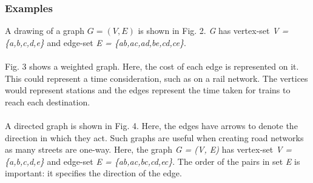 \documentclass[titlepage]{article}
\begin{document}
\subsubsection{Examples}
A drawing of a graph \({G = (V, E)}\) is shown in Fig. 2. \textit{G} has vertex-set \textit{V = \{a,b,c,d,e\}} and edge-set \textit{E = \{ab,ac,ad,be,cd,ce\}}. 
\\\\
Fig. 3 shows a weighted graph. Here, the cost of each edge is represented on it. This could represent a time consideration, such as on a rail network. The vertices would represent stations and the edges represent the time taken for trains to reach each destination. 
\\\\
A directed graph is shown in Fig. 4. Here, the edges have arrows to denote the direction in which they act. Such graphs are useful when creating road networks as many streets are one-way. Here, the graph \textit{G = (V, E)} has vertex-set \textit{V = \{a,b,c,d,e\}} and edge-set \textit{E = \{ab,ac,bc,cd,ec\}}. The order of the pairs in set \textit{E} is important: it specifies the direction of the edge. \cite{textbook}
\end{document}
